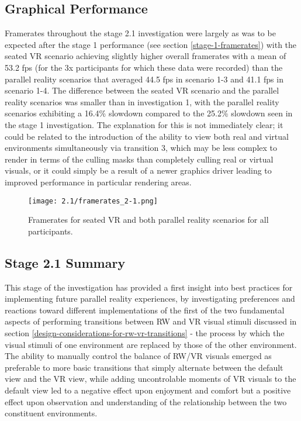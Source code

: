 \subsection{Graphical Performance}
\label{stage-2-1-framerates}
Framerates throughout the stage 2.1 investigation were largely as was to be expected after the stage 1 performance (see section \ref{stage-1-framerates}) with the seated VR scenario achieving slightly higher overall framerates with a mean of 53.2 fps (for the 3x participants for which these data were recorded) than the parallel reality scenarios that averaged 44.5 fps in scenario 1-3 and 41.1 fps in scenario 1-4. The difference between the seated VR scenario and the parallel reality scenarios was smaller than in investigation 1, with the parallel reality scenarios exhibiting a 16.4\% slowdown compared to the 25.2\% slowdown seen in the stage 1 investigation. The explanation for this is not immediately clear; it could be related to the introduction of the ability to view both real and virtual environments simultaneously via transition 3, which may be less complex to render in terms of the culling masks than completely culling real or virtual visuals, or it could simply be a result of a newer graphics driver leading to improved performance in particular rendering areas.

\begin{figure}[h]
	\begin{center}
	\texttt{[image: 2.1/framerates\_2-1.png]}
	\caption{Framerates for seated VR and both parallel reality scenarios for all participants.}
	\label{framerates_2-1.png}
	\end{center}
\end{figure}


\subsection{Stage 2.1 Summary}

This stage of the investigation has provided a first insight into best practices for implementing future parallel reality experiences, by investigating preferences and reactions toward different implementations of the first of the two fundamental aspects of performing transitions between RW and VR visual stimuli discussed in section \ref{design-considerations-for-rw-vr-transitions} - the process by which the visual stimuli of one environment are replaced by those of the other environment. The ability to manually control the balance of RW/VR visuals emerged as preferable to more basic transitions that simply alternate between the default view and the VR view, while adding uncontrolable moments of VR visuals to the default view led to a negative effect upon enjoyment and comfort but a positive effect upon observation and understanding of the relationship between the two constituent environments.

